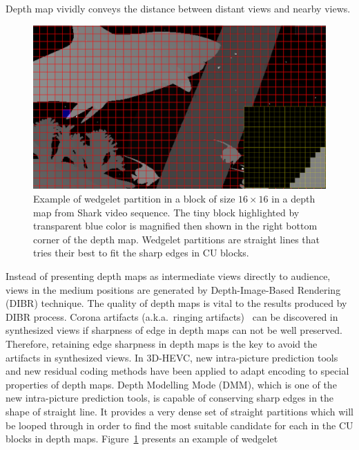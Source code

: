 Depth map vividly conveys the distance between distant views
and nearby views.
\begin{figure}[!t]
    \centering
    \includegraphics[width=\textwidth,height=\textheight,keepaspectratio]{Figures/wedgelet}
    \caption[Wedgelet partition illustration]
    {Example of wedgelet partition in a block of size 
    \(16\times16\) in a depth map
    from Shark video sequence.
    The tiny block highlighted by transparent blue color
    is magnified then shown in the right bottom corner
    of the depth map.
    Wedgelet partitions are straight lines
    that tries their best to fit the sharp edges in CU blocks.
    }\label{fig:wedgelet-partition}
\end{figure}
Instead of presenting depth maps as 
intermediate views directly to audience, views in the medium
positions are generated by Depth-Image-Based Rendering (DIBR) technique.
The quality of depth maps is vital to the results produced by
DIBR process.
Corona artifacts (a.k.a.\ ringing artifacts)~\parencite{RN44}
can be discovered in synthesized
views if sharpness of edge in depth maps can not be well
preserved.
Therefore, retaining edge sharpness in depth maps is the key to avoid the
artifacts in synthesized views.
In 3D-HEVC, new intra-picture prediction tools and new residual coding methods
have been applied to adapt encoding to special properties of depth maps.
Depth Modelling Mode (DMM), which is one of the new intra-picture
prediction tools, is capable of conserving sharp edges in the shape
of straight line.
It provides a very dense set of straight partitions
which will be looped through in order to find the most suitable candidate
for each in the CU blocks in depth maps.
Figure~\ref{fig:wedgelet-partition} presents an example of wedgelet

